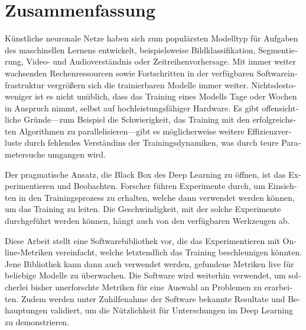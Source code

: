 \chapter*{Zusammenfassung}

\begin{otherlanguage}{german}
     Künstliche neuronale Netze haben sich zum populärsten Modelltyp für
     Aufgaben des maschinellen Lernens entwickelt, beispielsweise
     Bildklassifikation, Segmentierung, Video- und Audioverständnis oder
     Zeitreihenvorhersage. Mit immer weiter wachsenden Rechenressourcen sowie
     Fortschritten in der verfügbaren Softwareinfrastruktur vergrößern sich die
     trainierbaren Modelle immer weiter. Nichtsdestoweniger ist es nicht
     unüblich, dass das Training eines Modells Tage oder Wochen in Anspruch
     nimmt, selbst auf hochleistungsfähiger Hardware. Es gibt offensichtliche
     Gründe---zum Beispiel die Schwierigkeit, das Training mit den
     erfolgreichsten Algorithmen zu parallelisieren---gibt es möglicherweise
     weitere Effizienzverluste durch fehlendes Verständins der
     Trainingsdynamiken, was durch teure Parametersuche umgangen wird.

     Der pragmatische Ansatz, die Black Box des Deep Learning zu öffnen, ist das
     Experimentieren und Beobachten. Forscher führen Experimente durch, um
     Einsichten in den Trainingsprozess zu erhalten, welche dann verwendet
     werden können, um das Training zu leiten. Die Geschwindigkeit, mit der
     solche Experimente durchgeführt werden können, hängt auch von den verfügbaren
     Werkzeugen ab.

     Diese Arbeit stellt eine Softwarebibliothek vor, die das Experimentieren
     mit Online-Metriken vereinfacht, welche letztendlich das Training
     beschleunigen könnten. Jene Bibliothek kann dann auch verwendet werden,
     gefundene Metriken live für beliebige Modelle zu überwachen. Die Software
     wird weiterhin verwendet, um solcherlei bisher unerforschte Metriken für
     eine Auswahl an Problemen zu erarbeiten. Zudem werden unter Zuhilfenahme
     der Software bekannte Resultate und Behauptungen validiert, um die
     Nützlichkeit für Unterschungen im Deep Learning zu demonstrieren.

\end{otherlanguage}
